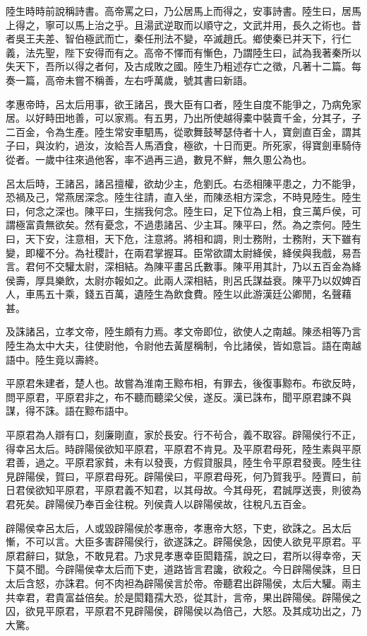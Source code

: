 陸生時時前說稱詩書。高帝罵之曰，乃公居馬上而得之，安事詩書。陸生曰，居馬上得之，寧可以馬上治之乎。且湯武逆取而以順守之，文武并用，長久之術也。昔者吳王夫差、智伯極武而亡，秦任刑法不變，卒滅趙氏。鄉使秦已并天下，行仁義，法先聖，陛下安得而有之。高帝不懌而有慚色，乃謂陸生曰，試為我著秦所以失天下，吾所以得之者何，及古成敗之國。陸生乃粗述存亡之徵，凡著十二篇。每奏一篇，高帝未嘗不稱善，左右呼萬歲，號其書曰新語。

孝惠帝時，呂太后用事，欲王諸呂，畏大臣有口者，陸生自度不能爭之，乃病免家居。以好畤田地善，可以家焉。有五男，乃出所使越得橐中裝賣千金，分其子，子二百金，令為生產。陸生常安車駟馬，從歌舞鼓琴瑟侍者十人，寶劍直百金，謂其子曰，與汝約，過汝，汝給吾人馬酒食，極欲，十日而更。所死家，得寶劍車騎侍從者。一歲中往來過他客，率不過再三過，數見不鮮，無久慁公為也。

呂太后時，王諸呂，諸呂擅權，欲劫少主，危劉氏。右丞相陳平患之，力不能爭，恐禍及己，常燕居深念。陸生往請，直入坐，而陳丞相方深念，不時見陸生。陸生曰，何念之深也。陳平曰，生揣我何念。陸生曰，足下位為上相，食三萬戶侯，可謂極富貴無欲矣。然有憂念，不過患諸呂、少主耳。陳平曰，然。為之柰何。陸生曰，天下安，注意相，天下危，注意將。將相和調，則士務附，士務附，天下雖有變，即權不分。為社稷計，在兩君掌握耳。臣常欲謂太尉絳侯，絳侯與我戲，易吾言。君何不交驩太尉，深相結。為陳平畫呂氏數事。陳平用其計，乃以五百金為絳侯壽，厚具樂飲，太尉亦報如之。此兩人深相結，則呂氏謀益衰。陳平乃以奴婢百人，車馬五十乘，錢五百萬，遺陸生為飲食費。陸生以此游漢廷公卿閒，名聲藉甚。

及誅諸呂，立孝文帝，陸生頗有力焉。孝文帝即位，欲使人之南越。陳丞相等乃言陸生為太中大夫，往使尉他，令尉他去黃屋稱制，令比諸侯，皆如意旨。語在南越語中。陸生竟以壽終。

平原君朱建者，楚人也。故嘗為淮南王黥布相，有罪去，後復事黥布。布欲反時，問平原君，平原君非之，布不聽而聽梁父侯，遂反。漢已誅布，聞平原君諫不與謀，得不誅。語在黥布語中。

平原君為人辯有口，刻廉剛直，家於長安。行不茍合，義不取容。辟陽侯行不正，得幸呂太后。時辟陽侯欲知平原君，平原君不肯見。及平原君母死，陸生素與平原君善，過之。平原君家貧，未有以發喪，方假貸服具，陸生令平原君發喪。陸生往見辟陽侯，賀曰，平原君母死。辟陽侯曰，平原君母死，何乃賀我乎。陸賈曰，前日君侯欲知平原君，平原君義不知君，以其母故。今其母死，君誠厚送喪，則彼為君死矣。辟陽侯乃奉百金往稅。列侯貴人以辟陽侯故，往稅凡五百金。

辟陽侯幸呂太后，人或毀辟陽侯於孝惠帝，孝惠帝大怒，下吏，欲誅之。呂太后慚，不可以言。大臣多害辟陽侯行，欲遂誅之。辟陽侯急，因使人欲見平原君。平原君辭曰，獄急，不敢見君。乃求見孝惠幸臣閎籍孺，說之曰，君所以得幸帝，天下莫不聞。今辟陽侯幸太后而下吏，道路皆言君讒，欲殺之。今日辟陽侯誅，旦日太后含怒，亦誅君。何不肉袒為辟陽侯言於帝。帝聽君出辟陽侯，太后大驩。兩主共幸君，君貴富益倍矣。於是閎籍孺大恐，從其計，言帝，果出辟陽侯。辟陽侯之囚，欲見平原君，平原君不見辟陽侯，辟陽侯以為倍己，大怒。及其成功出之，乃大驚。

